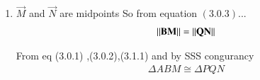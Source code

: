 \begin{enumerate}[label=\thesection.\arabic*.,ref=\thesection.\theenumi]

%
\item $\vec{M}$ and $\vec{N}$ are midpoints So from equation $\left(3.0.3\right)$... 
%
\begin{align}
\left\lVert\mathbf{BM}\right\rVert = \left\lVert\mathbf{QN}\right\rVert
\end{align}

  From eq (3.0.1) ,(3.0.2),(3.1.1) and by SSS congurancy 
 \begin{align}
 \Delta ABM \cong \Delta PQN
 \end{align}
\end{enumerate}
